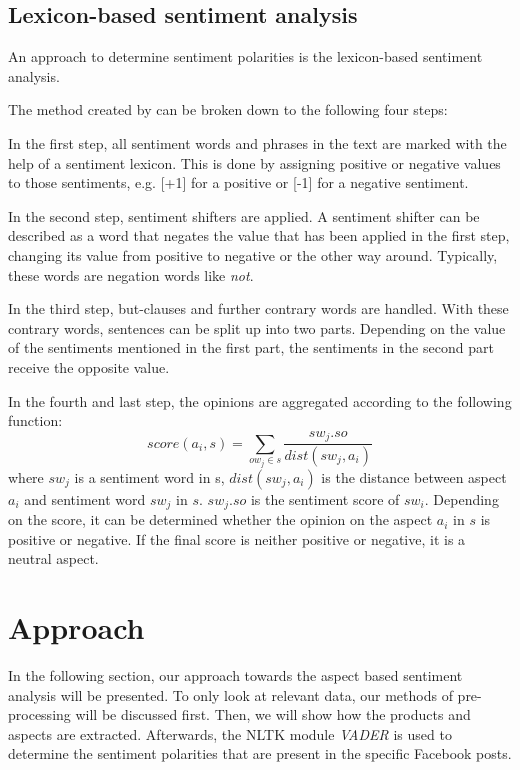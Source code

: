 \documentclass[10pt,a4paper]{article}
\begin{document}
		\subsection{Lexicon-based sentiment analysis}
		An approach to determine sentiment polarities is the lexicon-based sentiment analysis.
		
		The method created by \cite{Ding:2008:HLA:1341531.1341561} can be broken down to the following four steps: 
		
		In the first step, all sentiment words and phrases in the text are marked with the help of a sentiment lexicon. This is done by assigning positive or negative values to those sentiments, e.g. [+1] for a positive or [-1] for a negative sentiment.
		
		In the second step, sentiment shifters are applied. A sentiment shifter can be described as a word that negates the value that has been applied in the first step, changing its value from positive to negative or the other way around. Typically, these words are negation words like \textit{not}. 
		
		In the third step, but-clauses and further contrary words are handled. With these contrary words, sentences can be split up into two parts. Depending on the value of the sentiments mentioned in the first part, the sentiments in the second part receive the opposite value.
		
		In the fourth and last step, the opinions are aggregated according to the following function:
		\begin{displaymath}
			score(a_i,s) = \sum_{ow_j \in s} \frac{sw_j.so}{dist(sw_j,a_i)}
		\end{displaymath}
		where $sw_j$ is a sentiment word in s, $dist(sw_j, a_i)$ is the distance between aspect $a_i$ and sentiment word $sw_j$ in $s$. $sw_j.so$ is the sentiment score of $sw_i$.  Depending on the score, it can be determined whether the opinion on the aspect $a_i$ in $s$ is positive or negative. If the final score is neither positive or negative, it is a neutral aspect.
	
	
	\section{Approach}
	In the following section, our approach towards the aspect based sentiment analysis will be presented. To only look at relevant data, our methods of pre-processing will be discussed first. Then, we will show how the products and aspects are extracted. Afterwards, the NLTK module \textit{VADER} is used to determine the sentiment polarities that are present in the specific Facebook posts.
			
\end{document}
